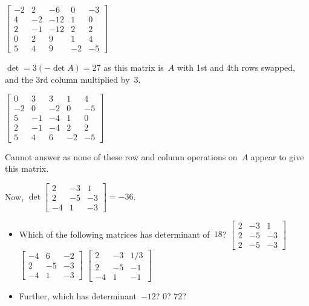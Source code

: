 \begin{example}
\begin{Parts}
\begin{OmitV1}
\item \(\begin{bmatrix}-2&2&-6&0&-3
\\4&-2&-12&1&0
\\2&-1&-12&2&2
\\0&2&9&1&4
\\5&4&9&-2&-5\end{bmatrix}\)
\begin{solution} 
\(\det=3(-\det A)=27\) as this matrix is~\(A\) with 1st and 4th rows swapped, and the 3rd column multiplied by~\(3\). 
\end{solution}

\item \(\begin{bmatrix}0&3&3&1&4
\\-2&0&-2&0&-5
\\5&-1&-4&1&0
\\2&-1&-4&2&2
\\5&4&6&-2&-5\end{bmatrix}\)
\begin{solution} 
Cannot answer as none of these row and column operations on~\(A\) appear to give this matrix.
\end{solution}
\end{OmitV1}

\end{Parts}
\end{example}




\begin{activity}
Now, \(\det\begin{bmatrix} 2&-3&1
\\2&-5&-3
\\-4&1&-3 \end{bmatrix}=-36\). 
\begin{itemize}
\item Which of the following matrices has determinant of~\(18\)?
{\(\begin{bmatrix} 2&-3&1
\\2&-5&-3
\\2&-5&-3 \end{bmatrix}\)}
{\(\begin{bmatrix} -4&6&-2
\\2&-5&-3
\\-4&1&-3 \end{bmatrix}\)}
{\(\begin{bmatrix} 2&-3&1/3
\\2&-5&-1
\\-4&1&-1 \end{bmatrix}\)}
\item Further, which has determinant~\(-12\)? \(0\)? \(72\)?
\end{itemize}
\end{activity}



